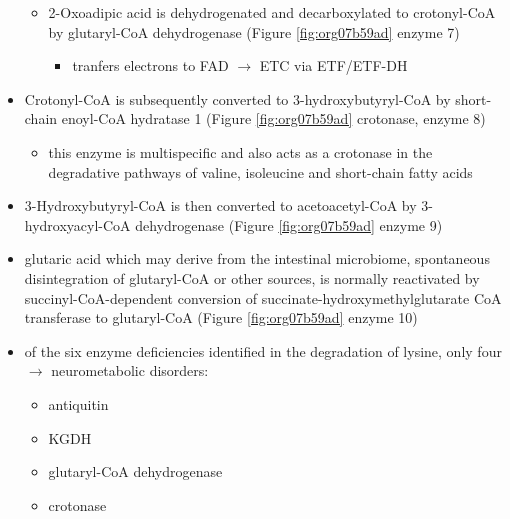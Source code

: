 \documentclass{scrartcl}
\begin{document}
\begin{itemize}
\begin{itemize}
\item 2-Oxoadipic acid is dehydrogenated and decarboxylated to
crotonyl-CoA by glutaryl-CoA dehydrogenase (Figure \ref{fig:org07b59ad} enzyme 7)
\begin{itemize}
\item tranfers electrons to FAD \(\to\) ETC via ETF/ETF-DH
\end{itemize}
\end{itemize}

\item Crotonyl-CoA is subsequently converted to 3-hydroxybutyryl-CoA by
short-chain enoyl-CoA hydratase 1 (Figure \ref{fig:org07b59ad} crotonase, enzyme 8)
\begin{itemize}
\item this enzyme is multispecific and also acts as a crotonase in the
degradative pathways of valine, isoleucine and short-chain fatty
acids
\end{itemize}

\item 3-Hydroxybutyryl-CoA is then converted to acetoacetyl-CoA by
3-hydroxyacyl-CoA dehydrogenase (Figure \ref{fig:org07b59ad} enzyme 9)
\item glutaric acid which may derive from the intestinal microbiome,
spontaneous disintegration of glutaryl-CoA or other sources, is
normally reactivated by succinyl-CoA-dependent conversion of
succinate-hydroxymethylglutarate CoA transferase to glutaryl-CoA
(Figure \ref{fig:org07b59ad} enzyme 10)

\item of the six enzyme deficiencies identified in the degradation of
lysine, only four \(\to\) neurometabolic disorders:
\begin{itemize}
\item antiquitin
\item KGDH
\item glutaryl-CoA dehydrogenase
\item crotonase
\end{itemize}
\end{itemize}
\end{document}
